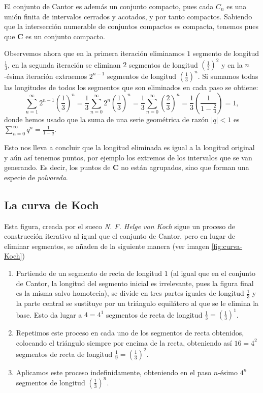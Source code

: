 El conjunto de Cantor es además un conjunto compacto, pues cada $C_n$ es una unión finita de intervalos cerrados y acotados, y por tanto compactos. Sabiendo que la intersección numerable de conjuntos compactos es compacta, tenemos pues que $\mathbf{C}$ es un conjunto compacto.

Observemos ahora que en la primera iteración eliminamos $1$ segmento de longitud $\frac 1 3$, en la segunda iteración se eliminan $2$ segmentos de longitud $\left(\frac{1}{3}\right)^2$ y en la $n$-ésima iteración extraemos $2^{n-1}$ segmentos de longitud $\left(\frac{1}{3}\right)^n$. Si sumamos todas las longitudes de todos los segmentos que son eliminados en cada paso se obtiene:
$$
\sum_{n=1}^\infty 2^{n-1}\left(\frac 1 3\right)^n  = \frac 1 3  \sum_{n=0}^\infty 2^n\left(\frac 1 3\right)^n =  \frac 1 3  \sum_{n=0}^\infty \left(\frac 2 3\right)^n = \frac{1}{3} \left(\frac{1}{1-\frac{2}{3}}\right) = 1,
$$
donde hemos usado que la suma de una serie geométrica de razón $|q|<1$ es $\sum_{n=0}^\infty q^n = \frac{1}{1-q}$.

Esto nos lleva a concluir que la longitud eliminada es igual a la longitud original y aún así tenemos puntos, por ejemplo los extremos de los intervalos que se van generando. Es decir, los puntos de $\mathbf{C}$ no están agrupados, sino que forman una especie de \textit{polvareda}.

\subsection{La curva de Koch}
\label{subsection:curva-Koch}

Esta figura, creada por el sueco \textit{N. F. Helge von Koch} sigue un proceso de construcción iterativo al igual que el conjunto de Cantor, pero en lugar de eliminar segmentos, se añaden de la siguiente manera (ver imagen \ref{fig:curva-Koch})

\begin{enumerate}
\item Partiendo de un segmento de recta de longitud $1$ (al igual que en el conjunto de Cantor, la longitud del segmento inicial es irrelevante, pues la figura final es la misma salvo homotecia), se divide en tres partes iguales de longitud $\frac 1 3$ y la parte central se sustituye por un triángulo equilátero al que se le elimina la base. Esto da lugar a $4=4^1$ segmentos de recta de longitud $\frac 1 3=\left(\frac 1 3\right)^1$.

\item Repetimos este proceso en cada uno de los segmentos de recta obtenidos, colocando el triángulo siempre por encima de la recta, obteniendo así $16=4^2$ segmentos de recta de longitud $\frac 1 9=\left(\frac 1 3\right)^2$.

\item Aplicamos este proceso indefinidamente, obteniendo en el paso $n$-ésimo $4^n$ segmentos de longitud $\left(\frac 1 3\right)^n$. 
\end{enumerate}

